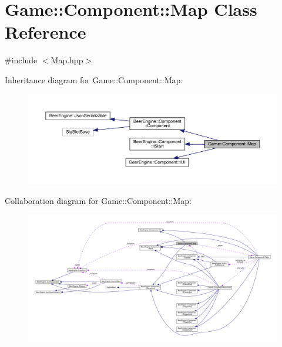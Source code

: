 \hypertarget{class_game_1_1_component_1_1_map}{}\section{Game\+:\+:Component\+:\+:Map Class Reference}
\label{class_game_1_1_component_1_1_map}


{\ttfamily \#include $<$Map.\+hpp$>$}



Inheritance diagram for Game\+:\+:Component\+:\+:Map\+:
\nopagebreak
\begin{figure}[H]
\begin{center}
\leavevmode
\includegraphics[width=350pt]{class_game_1_1_component_1_1_map__inherit__graph}
\end{center}
\end{figure}


Collaboration diagram for Game\+:\+:Component\+:\+:Map\+:
\nopagebreak
\begin{figure}[H]
\begin{center}
\leavevmode
\includegraphics[width=350pt]{class_game_1_1_component_1_1_map__coll__graph}
\end{center}
\end{figure}
